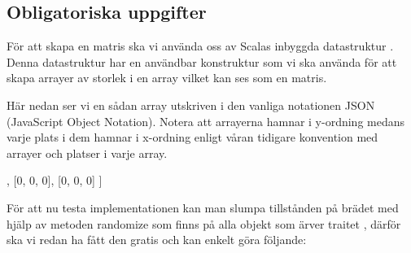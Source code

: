 \subsection{Obligatoriska uppgifter}




        För att skapa en matris ska vi använda oss av Scalas inbyggda datastruktur .
        Denna datastruktur har en användbar konstruktur  som vi ska använda för att skapa
         arrayer av storlek  i en array vilket kan ses som en matris.

        Här nedan ser vi en sådan array utskriven i den vanliga notationen JSON (JavaScript Object Notation).
        Notera att arrayerna hamnar i y-ordning medans varje plats i dem hamnar i x-ordning enligt våran tidigare
        konvention med  arrayer och  platser i varje array.

\begin{Code}
[
    [0, 0, 0],
    [0, 0, 0],
    [0, 0, 0]
]
\end{Code}




        För att nu testa implementationen kan man slumpa tillstånden på brädet med hjälp av metoden randomize som finns på
        alla objekt som ärver traitet , därför ska vi redan ha fått den gratis och kan enkelt göra följande:

